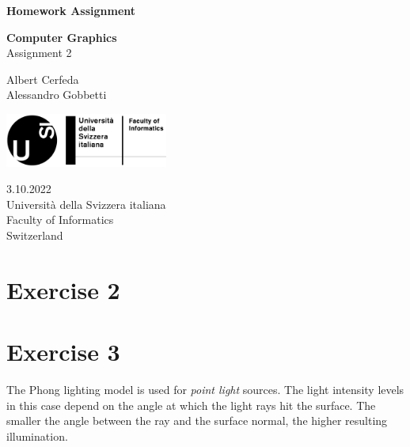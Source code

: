 \documentclass[tikz,14pt,fleqn]{article}
\newcommand\namesurname{Albert Cerfeda\\Alessandro Gobbetti}
\newcommand\assignment{Assignment 2}
\newcommand\subject{Computer Graphics}
\newcommand\documentdate{3.10.2022}
\begin{document}
\begin{titlepage}
   \begin{center}
       \vspace*{1cm}

       \textbf{\Large{Homework Assignment}}

       \vspace{0.5cm}
        \textbf{\subject}\\[5mm]
       \assignment
        
            
       \vspace{1.8cm}

        \namesurname
       \tableofcontents

       \vspace*{\fill}
     
       \includegraphics[width=0.4\textwidth]{logo.png}
       
        \documentdate \\
        Università della Svizzera italiana\\
        Faculty of Informatics\\
        Switzerland\\

   \end{center}
\end{titlepage}


\section{Exercise 2}


\section{Exercise 3}
The Phong lighting model is used for \textit{point light} sources.
The light intensity levels in this case depend on the angle at which the light rays hit the surface. The smaller the angle between the ray and the surface normal, the higher resulting illumination.\\
\end{document}

